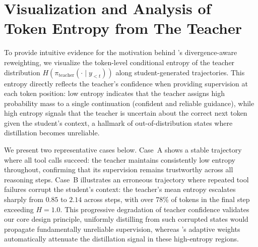 \section{Visualization and Analysis of Token Entropy from The Teacher}
\label{app:H}









To provide intuitive evidence for the motivation behind \ourmodel's divergence-aware reweighting, we visualize the token-level conditional entropy of the teacher distribution $H(\pi_{\mathrm{teacher}}(\cdot \mid y_{<t}))$ along student-generated trajectories. This entropy directly reflects the teacher's confidence when providing supervision at each token position: low entropy indicates that the teacher assigns high probability mass to a single continuation (\ie confident and reliable guidance), while high entropy signals that the teacher is uncertain about the correct next token given the student's context, \ie a hallmark of out-of-distribution states where distillation becomes unreliable.

We present two representative cases below. Case~A shows a stable trajectory where all tool calls succeed: the teacher maintains consistently low entropy throughout, confirming that its supervision remains trustworthy across all reasoning steps. Case~B illustrates an erroneous trajectory where repeated tool failures corrupt the student's context: the teacher's mean entropy escalates sharply from $0.85$ to $2.14$ across steps, with over 78\% of tokens in the final step exceeding $H{=}1.0$. This progressive degradation of teacher confidence validates our core design principle, \ie uniformly distilling from such corrupted states would propagate fundamentally unreliable supervision, whereas \ourmodel's adaptive weights automatically attenuate the distillation signal in these high-entropy regions. 




